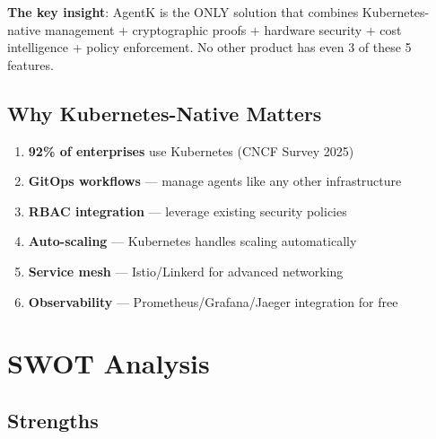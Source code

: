 \documentclass[12pt,a4paper,openany]{report}
\begin{document}
\begin{moneybox}
\textbf{The key insight}: AgentK is the ONLY solution that combines Kubernetes-native management + cryptographic proofs + hardware security + cost intelligence + policy enforcement. No other product has even 3 of these 5 features.
\end{moneybox}

\section{Why Kubernetes-Native Matters}

\begin{enumerate}
    \item \textbf{92\% of enterprises} use Kubernetes (CNCF Survey 2025)
    \item \textbf{GitOps workflows} — manage agents like any other infrastructure
    \item \textbf{RBAC integration} — leverage existing security policies
    \item \textbf{Auto-scaling} — Kubernetes handles scaling automatically
    \item \textbf{Service mesh} — Istio/Linkerd for advanced networking
    \item \textbf{Observability} — Prometheus/Grafana/Jaeger integration for free
\end{enumerate}


\chapter{SWOT Analysis}

\section{Strengths}
\end{document}
